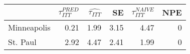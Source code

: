 
\begin{tabular}{lrrrrr}
\toprule
  & $\tau_{ITT}^{PRED}$ & $\hat{\tau_{ITT}}$ & SE & $\tau_{ITT}^{NAIVE}$ & NPE\\
\midrule
Minneapolis & 0.21 & 1.99 & 3.15 & 4.47 & 0\\
St. Paul & 2.92 & 4.47 & 2.41 & 1.99 & 0\\
\bottomrule
\end{tabular}